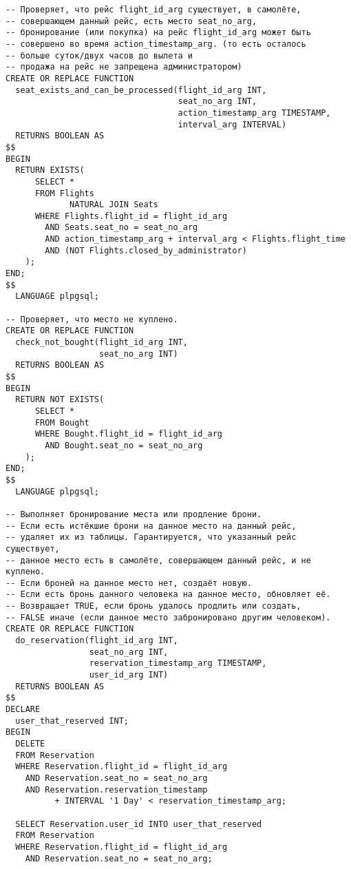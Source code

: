 \documentclass{article}
\begin{document}
\begin{verbatim}
-- Проверяет, что рейс flight_id_arg существует, в самолёте,
-- совершающем данный рейс, есть место seat_no_arg,
-- бронирование (или покупка) на рейс flight_id_arg может быть
-- совершено во время action_timestamp_arg. (то есть осталось
-- больше суток/двух часов до вылета и
-- продажа на рейс не запрещена администратором)
CREATE OR REPLACE FUNCTION
  seat_exists_and_can_be_processed(flight_id_arg INT,
                                   seat_no_arg INT,
                                   action_timestamp_arg TIMESTAMP,
                                   interval_arg INTERVAL)
  RETURNS BOOLEAN AS
$$
BEGIN
  RETURN EXISTS(
      SELECT *
      FROM Flights
             NATURAL JOIN Seats
      WHERE Flights.flight_id = flight_id_arg
        AND Seats.seat_no = seat_no_arg
        AND action_timestamp_arg + interval_arg < Flights.flight_time
        AND (NOT Flights.closed_by_administrator)
    );
END;
$$
  LANGUAGE plpgsql;

-- Проверяет, что место не куплено.
CREATE OR REPLACE FUNCTION
  check_not_bought(flight_id_arg INT,
                   seat_no_arg INT)
  RETURNS BOOLEAN AS
$$
BEGIN
  RETURN NOT EXISTS(
      SELECT *
      FROM Bought
      WHERE Bought.flight_id = flight_id_arg
        AND Bought.seat_no = seat_no_arg
    );
END;
$$
  LANGUAGE plpgsql;

-- Выполняет бронирование места или продление брони.
-- Если есть истёкшие брони на данное место на данный рейс,
-- удаляет их из таблицы. Гарантируется, что указанный рейс существует,
-- данное место есть в самолёте, совершающем данный рейс, и не куплено.
-- Если броней на данное место нет, создаёт новую.
-- Если есть бронь данного человека на данное место, обновляет её.
-- Возвращает TRUE, если бронь удалось продлить или создать,
-- FALSE иначе (если данное место забронировано другим человеком).
CREATE OR REPLACE FUNCTION
  do_reservation(flight_id_arg INT,
                 seat_no_arg INT,
                 reservation_timestamp_arg TIMESTAMP,
                 user_id_arg INT)
  RETURNS BOOLEAN AS
$$
DECLARE
  user_that_reserved INT;
BEGIN
  DELETE
  FROM Reservation
  WHERE Reservation.flight_id = flight_id_arg
    AND Reservation.seat_no = seat_no_arg
    AND Reservation.reservation_timestamp
          + INTERVAL '1 Day' < reservation_timestamp_arg;

  SELECT Reservation.user_id INTO user_that_reserved
  FROM Reservation
  WHERE Reservation.flight_id = flight_id_arg
    AND Reservation.seat_no = seat_no_arg;


\end{verbatim}
\end{document}
